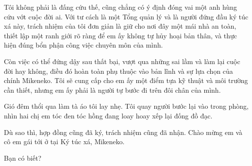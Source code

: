 ﻿\documentclass[../main.tex]{subfiles}
\begin{document}
Tôi không phải là đấng cứu thế, cũng chẳng có ý định đóng vai một anh hùng cứu vớt cuộc đời ai. Với tư cách là một Tổng quản lý và là người đứng đầu ký túc xá này, trách nhiệm của tôi đơn giản là giữ cho nơi đây một mái nhà an toàn, thiết lập một ranh giới rõ ràng để em ấy không tự hủy hoại bản thân, và thực hiện đúng bổn phận công việc chuyên môn của mình.

Còn việc có thể đứng dậy sau thất bại, vượt qua những sai lầm và làm lại cuộc đời hay không, điều đó hoàn toàn phụ thuộc vào bản lĩnh và sự lựa chọn của chính Mikeneko. Tôi sẽ cung cấp cho em ấy một điểm tựa kỹ thuật và môi trường cần thiết, nhưng em ấy phải là người tự bước đi trên đôi chân của mình.

Gió đêm thổi qua làm tà áo tôi lay nhẹ. Tôi quay người bước lại vào trong phòng, nhìn hai chị em tóc đen tóc hồng đang loay hoay xếp lại đống đồ đạc.

Dù sao thì, hợp đồng cũng đã ký, trách nhiệm cũng đã nhận. Chào mừng em và cô em gái tới ở tại Ký túc xá, Mikeneko.

\begin{center}
    {\abv\Large Bạn có biết?}
\end{center}
\end{document}
